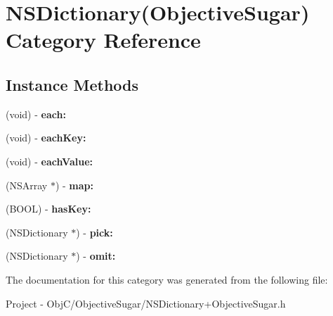 \hypertarget{category_n_s_dictionary_07_objective_sugar_08}{}\section{N\+S\+Dictionary(Objective\+Sugar) Category Reference}
\label{category_n_s_dictionary_07_objective_sugar_08}
\subsection*{Instance Methods}
\begin{DoxyCompactItemize}
\item 
\hypertarget{category_n_s_dictionary_07_objective_sugar_08_a588f4f18220ee4612171ce3567a218d0}{}(void) -\/ {\bfseries each\+:}\label{category_n_s_dictionary_07_objective_sugar_08_a588f4f18220ee4612171ce3567a218d0}

\item 
\hypertarget{category_n_s_dictionary_07_objective_sugar_08_a611366a6889d6a3370778acfa67eaddf}{}(void) -\/ {\bfseries each\+Key\+:}\label{category_n_s_dictionary_07_objective_sugar_08_a611366a6889d6a3370778acfa67eaddf}

\item 
\hypertarget{category_n_s_dictionary_07_objective_sugar_08_ac5f49ff737cafc112be1ee5fe7e2191f}{}(void) -\/ {\bfseries each\+Value\+:}\label{category_n_s_dictionary_07_objective_sugar_08_ac5f49ff737cafc112be1ee5fe7e2191f}

\item 
\hypertarget{category_n_s_dictionary_07_objective_sugar_08_a966ecbe7310291b68e691c1447c56f22}{}(N\+S\+Array $\ast$) -\/ {\bfseries map\+:}\label{category_n_s_dictionary_07_objective_sugar_08_a966ecbe7310291b68e691c1447c56f22}

\item 
\hypertarget{category_n_s_dictionary_07_objective_sugar_08_a7c150019b43ad3ef9a9356330631e288}{}(B\+O\+O\+L) -\/ {\bfseries has\+Key\+:}\label{category_n_s_dictionary_07_objective_sugar_08_a7c150019b43ad3ef9a9356330631e288}

\item 
\hypertarget{category_n_s_dictionary_07_objective_sugar_08_ad5cd134b6d09a96ff1ee7f2157cbd225}{}(N\+S\+Dictionary $\ast$) -\/ {\bfseries pick\+:}\label{category_n_s_dictionary_07_objective_sugar_08_ad5cd134b6d09a96ff1ee7f2157cbd225}

\item 
\hypertarget{category_n_s_dictionary_07_objective_sugar_08_a29cc461eefe28299a25dbe9c04ff3fc4}{}(N\+S\+Dictionary $\ast$) -\/ {\bfseries omit\+:}\label{category_n_s_dictionary_07_objective_sugar_08_a29cc461eefe28299a25dbe9c04ff3fc4}

\end{DoxyCompactItemize}


The documentation for this category was generated from the following file\+:\begin{DoxyCompactItemize}
\item 
Project -\/ Obj\+C/\+Objective\+Sugar/N\+S\+Dictionary+\+Objective\+Sugar.\+h\end{DoxyCompactItemize}
